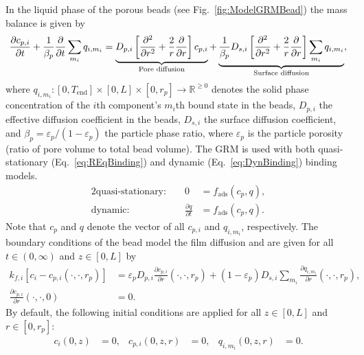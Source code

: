 In the liquid phase of the porous beads (see Fig.~\ref{fig:ModelGRMBead}) the mass balance is given by
\begin{align}
	\frac{\pdiff c_{p,i}}{\pdiff t} + \frac{1}{\beta_p} \frac{\pdiff}{\pdiff t} \sum_{m_i} q_{i,m_i} = \underbrace{D_{p,i} \left[\frac{\pdiff^2}{\pdiff r^2} + \frac{2}{r} \frac{\pdiff}{\pdiff r} \right]c_{p,i}}_{\text{Pore diffusion}} + \underbrace{\frac{1}{\beta_p} D_{s,i} \left[\frac{\pdiff^2}{\pdiff r^2} + \frac{2}{r} \frac{\pdiff }{\pdiff r} \right] \sum_{m_i} q_{i,m_i} }_{\text{Surface diffusion}}, \label{eq:ModelBead}
\end{align}
where $q_{i,m_i}\colon \left[0, T_{\text{end}}\right] \times [0,L] \times [0, r_p] \rightarrow \mathds{R}^{\geq 0}$ denotes the solid phase concentration of the $i$th component's $m_i$th bound state in the beads, $D_{p,i}$ the effective diffusion coefficient in the beads, $D_{s,i}$ the surface diffusion coefficient, and $\beta_p = \varepsilon_p / (1 - \varepsilon_p)$ the particle phase ratio, where $\varepsilon_p$ is the particle porosity (ratio of pore volume to total bead volume).
The GRM is used with both quasi-stationary (Eq.~\eqref{eq:REqBinding}) and dynamic (Eq.~\eqref{eq:DynBinding}) binding models. 
\begin{alignat}{2}
	\text{quasi-stationary: }& & 0 &= f_{\text{ads}}( c_p, q), \label{eq:REqBinding} \\
	\text{dynamic: }& & \frac{\partial q}{\partial t} &= f_{\text{ads}}( c_p, q). \label{eq:DynBinding}
\end{alignat}
Note that $c_p$ and $q$ denote the vector of all $c_{p,i}$ and $q_{i,m_i}$, respectively.
The boundary conditions of the bead model the film diffusion and are given for all ${t \in (0,\infty)}$ and $z \in [0,L]$ by
\begin{align}
	k_{f,i}\left[ c_i - c_{p,i}(\cdot, \cdot, r_p) \right] &= \varepsilon_p D_{p,i} \frac{\partial c_{p,i}}{\partial r}(\cdot, \cdot, r_p) + \left( 1 - \varepsilon_p\right) D_{s,i} \sum_{m_i} \frac{\partial q_{i,m_i}}{\partial r}(\cdot, \cdot, r_p), \label{eq:BCBeadIn} \\
	\frac{\partial c_{p,i}}{\partial r}(\cdot, \cdot, 0) &= 0. \label{eq:BCBeadCenter}
\end{align}
By default, the following initial conditions are applied for all $z \in [0,L]$ and $r \in \left[0, r_p\right]$:
\begin{align}
	c_i(0, z) &= 0, & c_{p,i}(0, z, r) &= 0, & q_{i,m_i}(0,z,r) &= 0. \label{eq:InitialConditions}
\end{align}

